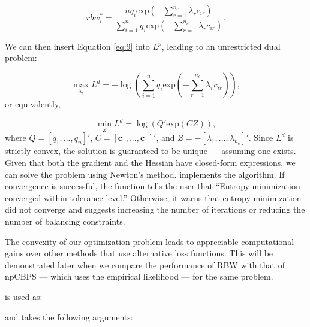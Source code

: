 \begin{equation}
\label{eq:9}
rbw_{i}^{*}=\frac{nq_{i}\text{exp}(-\sum^{n_{c}}_{r=1}\lambda_{r}c_{ir})}{\sum^{n}_{i=1}q_{i}\text{exp}(-\sum^{n_{c}}_{r=1}\lambda_{r}c_{ir})}. 
\end{equation}

We can then insert Equation \ref{eq:9} into \(L^{p}\), leading to an
unrestricted dual problem:

\begin{equation}
\label{eq:10}
\max_{\lambda_{r}}L^{d}=-\log \left(\sum^{n}_{i=1}q_{i}\text{exp}\left(-\sum^{n_{c}}_{r=1}\lambda_{r}c_{ir}\right)\right),
\end{equation}
or equivalently,

\begin{equation}
\label{eq:11}
\min_{Z}L^{d}=\log \left(Q'\text{exp}(CZ)\right),
\end{equation}
where \(Q=[q_{1},...,q_{n}]'\),
\(C=[\boldsymbol{c}_{1},...,\boldsymbol{c}_{1}]'\), and
\(Z=-[\lambda_{1},...,\lambda_{n_{c}}]'\). Since \(L^{d}\) is strictly
convex, the solution is guaranteed to be unique --- assuming one exists.
Given that both the gradient and the Hessian have closed-form
expressions, we can solve the problem using Newton's method.
 implements the algorithm. If convergence is successful, the
function tells the user that ``Entropy minimization converged within
tolerance level.'' Otherwise, it warns that entropy minimization did not
converge and suggests increasing the number of iterations or reducing
the number of balancing constraints.

The convexity of our optimization problem leads to appreciable
computational gains over other methods that use alternative loss
functions. This will be demonstrated later when we compare the
performance of RBW with that of npCBPS --- which uses the empirical
likelihood --- for the same problem.

 is used as:


and takes the following arguments:

